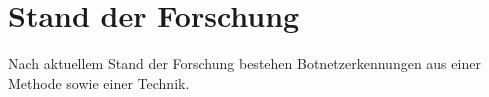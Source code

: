 \section{Stand der Forschung}
\label{sec:research}

Nach aktuellem Stand der Forschung bestehen Botnetzerkennungen aus einer Methode sowie einer Technik. 
